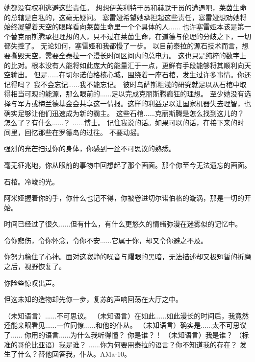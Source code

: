 \documentclass[openany]{book}
\begin{document}
\begin{dialogue}
     她都没有权利逃避这些责任。
     想想伊芙利特干员和赫默干员的遭遇吧，莱茵生命的总辖是自私的，这毫无疑问。
     塞雷娅希望她承担起这些责任，塞雷娅想劝她将始终凝望着天空的眼眸看向莱茵生命里一个个具体的人......
     也许塞雷娅本该是第一个替克丽斯腾承担理想的人，只不过在莱茵生命，在道德与伦理的分歧之下，一切都失控了。
     无论如何，塞雷娅和我都慢了一步。
     以目前泰拉的源石技术而言，想要撕毁天空，需要全泰拉一个漫长时间区间内的总电力。
     这也只是纯粹的数字上的比对。根本没有人能将如此庞大的能量汇于一点，更鲜有手段能够将其顺利向天空输出。
     但是......在切尔诺伯格核心城，围绕着一座石棺，发生过许多事情。你还记得吗？
     我不会忘记......我不能忘记。
     彼时乌萨斯粗浅的研究就足以从石棺中取得相当可观的能源，那么眼前的......足以完成克丽斯腾癫狂的理想。
     至少她没有选择与军方或梅兰德基金会共享这一情报。这样的利益足以让国家机器失去理智，也确实足够让他们迅速成为新的霸主。
     这些石棺......克丽斯腾是怎么找到这儿的？
     怎么了？有什么......？
     ......博士。
     记住我说的话。如果可以的话，在接下来的时间里，回忆那些在罗德岛的过往。
     不要动摇。
\end{dialogue}\par

强烈的光芒扫过你的身体，你感到一丝不可思议的熟悉。\par
毫无征兆地，你从眼前的事物中回想起了那个画面。那个你至今无法遗忘的画面。\par
石棺。冷峻的光。\par
阿米娅握着你的手，你什么也记不得，你被卷进切尔诺伯格的漩涡，那是一切的开始。\par
时间已经过了很久......但有什么，有什么更悠久的情绪弥漫在迷雾似的记忆中。\par
令你悲伤，令你怀念，令你不安......它属于你，却又令你避之不及。\par
你努力稳住了心神。面对这寂静的噪音与耀眼的黑暗，无法描述却又极短暂的折磨之后，视野恢复了。\par
你险些惊叹出声。\par
但这未知的造物却先你一步，复苏的声响回荡在大厅之中。

\begin{dialogue}
     （未知语言）......不可思议。
     （未知语言）在如此......如此漫长的时间后，我竟然还能亲眼看见......一位同僚......和他的仆从。
     （未知语言）确实是......太不可思议了......
     你用的语言......为什么我听得懂？
     你是谁？！
     （未知语言）我是谁？
     （标准的哥伦比亚语）我是谁？
     ......你为何要用泰拉的语言？你不知道我的存在？
     发生了什么？替他回答我，仆从。AMa-10。
\end{dialogue}
\end{document}
